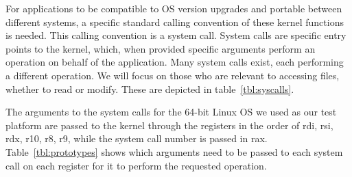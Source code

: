 \par For applications to be compatible to \ac{OS} version upgrades and portable between different systems, a specific standard calling convention of these kernel functions is needed. This calling convention is a system call. System calls are specific entry points to the kernel, which, when provided specific arguments perform an operation on behalf of the application. Many system calls exist, each performing a different operation. We will focus on those who are relevant to accessing files, whether to read or modify. These are depicted in table~\ref{tbl:syscalls}.

\par The arguments to the system calls for the 64-bit Linux \ac{OS} we used as our test platform are passed to the kernel through the registers in the order of rdi, rsi, rdx, r10, r8, r9, while the system call number is passed in rax. Table~\ref{tbl:prototypes} shows which arguments need to be passed to each system call on each register for it to perform the requested operation.

